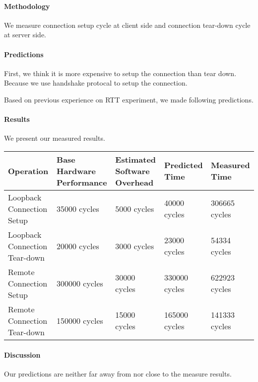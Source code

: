\paragraph{Methodology}
We measure connection setup cycle at client side and connection tear-down cycle at server side.

\paragraph{Predictions}
First, we think it is more expensive to setup the connection than tear down. Because we use handshake protocal to setup the connection. 

Based on previous experience on RTT experiment, we made following predictions.

\paragraph{Results}
We present our measured results.

\begin{center}
\begin{tabular}{| p{3cm} | p{3cm} | p{3cm} | p{3cm} | p{3cm} |}
Operation  & Base Hardware Performance  & Estimated Software Overhead  & Predicted Time  & Measured Time   \\
\hline
Loopback Connection Setup & 35000 cycles& 5000 cycles& 40000 cycles& 306665 cycles \\
Loopback Connection Tear-down & 20000 cycles& 3000 cycles& 23000 cycles& 54334 cycles \\
Remote Connection Setup & 300000  cycles& 30000 cycles& 330000 cycles& 622923 cycles\\
Remote Connection Tear-down & 150000  cycles& 15000 cycles& 165000 cycles& 141333 cycles\\
\end{tabular}
\end{center}


\paragraph{Discussion}
Our predictions are neither far away from nor close to the measure results.